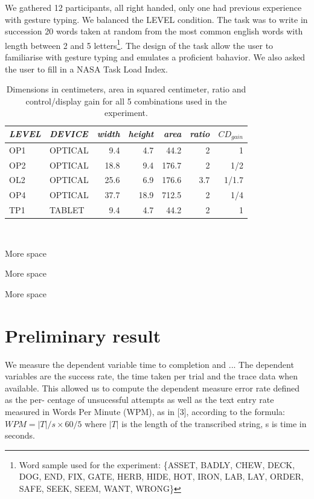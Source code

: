 \documentclass{chi-ext}
\newcommand{\smit}[1]{{\small\textit{{#1}}}}
\newcommand{\cdt}[1]{{\small\uppercase{{#1}}}}
\begin{document}
We gathered 12 participants, all right handed, only one had previous experience with gesture typing.
We  balanced the LEVEL condition. The task was to write in succession 20 words taken at random from the most common english words with length between 2 and 5 letters\footnote{Word sample used for the experiment: \{\cdt{asset}, \cdt{badly}, \cdt{chew}, \cdt{deck}, \cdt{dog}, \cdt{end}, \cdt{fix}, \cdt{gate}, \cdt{herb}, \cdt{hide}, \cdt{hot}, \cdt{iron}, \cdt{lab}, \cdt{lay}, \cdt{order}, \cdt{safe}, \cdt{seek}, \cdt{seem}, \cdt{want}, \cdt{wrong}\}}. The design of the task allow the user to familiarise with gesture typing and emulates a proficient bahavior. We also asked the user to fill in a NASA Task Load Index.

\begin{table}
  \centering
  \begin{tabular}{l l | r r r r r}
    \smit{LEVEL} & \smit{DEVICE} & \smit{width} & \smit{height} & \smit{area}& \smit{ratio} & \smit{$CD_{gain}$} \\
    \hline
    \cdt{OP1} & \cdt{optical} & 9.4 & 4.7 & 44.2 & 2 & 1 \\
    \cdt{OP2} & \cdt{optical} & 18.8 & 9.4 & 176.7 & 2 & 1/2 \\
    \cdt{OL2} & \cdt{optical} & 25.6 & 6.9 & 176.6 & 3.7 & 1/1.7 \\
    \cdt{OP4} & \cdt{optical} & 37.7 & 18.9 & 712.5 & 2 & 1/4 \\
    \hline
    \cdt{tp1} & \cdt{tablet} & 9.4 & 4.7 & 44.2 & 2 & 1 \\
  \end{tabular}
  \caption{Dimensions in centimeters, area in squared centimeter, ratio and control/display gain for all 5 combinations used in the experiment.}~\label{tab:cdt}
\end{table}

More space

More space

More space

\section{Preliminary result}
We measure the dependent variable time to completion and ...
The dependent variables are the success rate, the time taken per trial and the trace data when available. This allowed us to compute the dependent measure error rate defined as the per- centage of unsucessful attempts as well as the text entry rate measured in Words Per Minute (WPM), as in [3], according to the formula: $WPM = |T|/s \times 60/5$ where $|T|$ is the length of the transcribed string, s is time in seconds.
\end{document}

